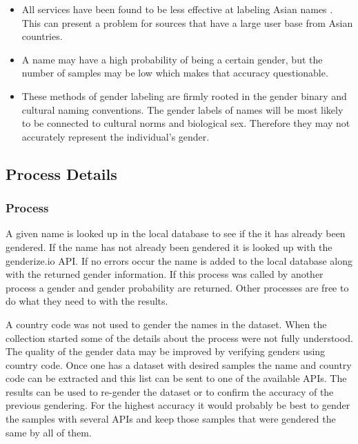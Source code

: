 \documentclass[12pt]{article}
\begin{document}
\begin{itemize}
    \item \begin{sloppypar} All services have been found to be less effective at labeling Asian names \cite{Santamaria2018}. This can present a problem for sources that have a large user base from Asian countries.\end{sloppypar}

    \item A name may have a high probability of being a certain gender, but the number of samples may be low which makes that accuracy questionable.
    
    \item These methods of gender labeling are firmly rooted in the gender binary and cultural naming conventions. The gender labels of names will be most likely to be connected to cultural norms and biological sex. Therefore they may not accurately represent the individual's gender.
\end{itemize}


\subsection{Process Details}
\subsubsection*{Process}
A given name is looked up in the local database to see if the it has already been gendered. If the name has not already been gendered it is looked up with the genderize.io API. If no errors occur the name is added to the local database along with the returned gender information. If this process was called by another process a gender and gender probability are returned. Other processes are free to do what they need to with the results.

A country code was not used to gender the names in the dataset. When the collection started some of the details about the process were not fully understood. The quality of the gender data may be improved by verifying genders using country code. Once one has a dataset with desired samples the name and country code can be extracted and this list can be sent to one of the available APIs. The results can be used to re-gender the dataset or to confirm the accuracy of the previous gendering. For the highest accuracy it would probably be best to gender the samples with several APIs and keep those samples that were gendered the same by all of them.
\end{document}

